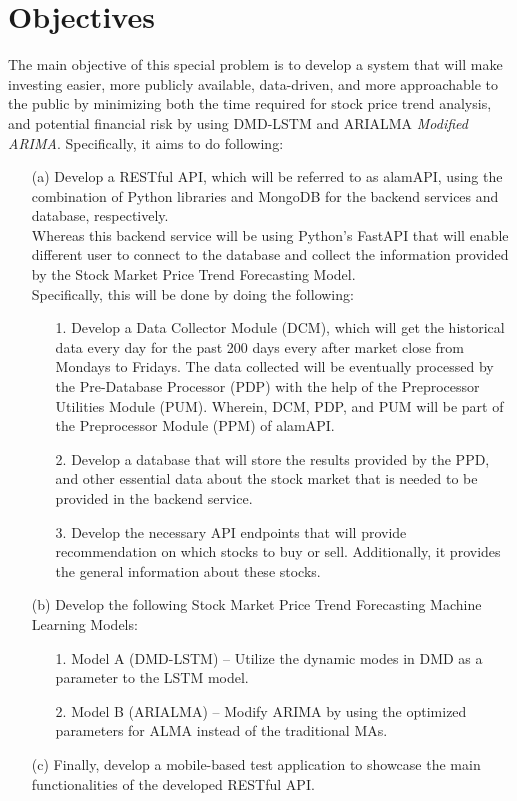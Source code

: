\section{Objectives}
\label{sec:objectives}
The main objective of this special problem is to develop a 
system that will make investing easier, more publicly available, 
data-driven, and more approachable to the public by minimizing both the 
time required for stock price trend analysis, and potential financial risk 
by using DMD-LSTM and ARIALMA \textit{Modified ARIMA}. Specifically, it aims to do following:
\begin{itemize}
  \item[(a)] Develop a RESTful API, which will be referred to as alamAPI, 
  using the combination of Python libraries and MongoDB for the backend 
  services and database, respectively.
  \hfill \\
  
  Whereas this backend service will be using Python’s 
  FastAPI that will enable different user to connect to 
  the database and collect the information provided by the 
  Stock Market Price Trend Forecasting Model.
  \hfill \\
  
  Specifically, this will be done by doing the following:
  \begin{itemize}
    \item[1.]	Develop a Data Collector Module (DCM), 
    which will get the historical data every day for 
    the past 200 days every after market close from Mondays to Fridays. 
    The data collected will be eventually processed by the Pre-Database Processor 
    (PDP) with the help of the Preprocessor Utilities Module (PUM). 
    Wherein, DCM, PDP, and PUM will be part of the Preprocessor Module 
    (PPM) of alamAPI.
    \item[2.]	Develop a database that will store the results provided by the PPD,
    and other essential data about the stock market that is needed to be provided
    in the backend service.
    \item[3.]	Develop the necessary API endpoints 
    that will provide recommendation on which stocks to buy or sell. 
    Additionally, it provides the general information about these stocks.
  \end{itemize}
  \item[(b)] Develop the following Stock Market Price Trend Forecasting 
  Machine Learning Models:
  \begin{itemize}
    \item[1.]	Model A (DMD-LSTM) – Utilize the dynamic modes in DMD as a 
    parameter to the LSTM model.
    \item[2.] Model B (ARIALMA) – Modify ARIMA by using 
    the optimized parameters for ALMA instead of the traditional MAs.
  \end{itemize}
  \item[(c)] Finally, develop a mobile-based test application to showcase 
  the main functionalities of the developed RESTful API.
\end{itemize}